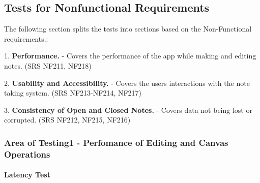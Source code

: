 \documentclass[12pt, titlepage]{article}
\begin{document}
\subsection{Tests for Nonfunctional Requirements}










The following section splits the tests into sections based on the Non-Functional requirements.:

1. \textbf{Performance.}  - Covers the performance of the app while making and editing notes. (SRS NF211, NF218)

2. \textbf{Usability and Accessibility.} - Covers the users interactions with the note taking system. (SRS NF213-NF214, NF217)

3. \textbf{Consistency of Open and Closed Notes.} - Covers data not being lost or corrupted.  (SRS NF212, NF215, NF216)



\subsubsection{Area of Testing1 - Perfomance of Editing and Canvas Operations}

\paragraph{Latency Test}
\end{document}
